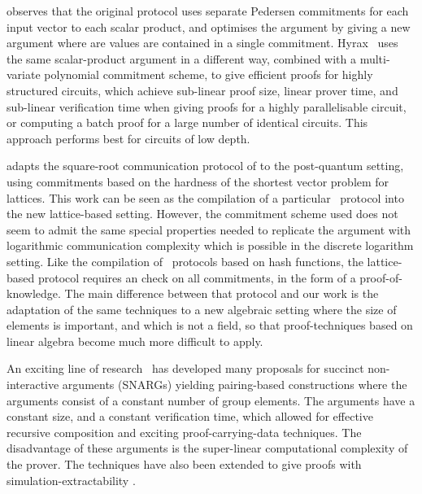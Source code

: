\cite{BunzBBPWM18} observes that the original protocol uses separate Pedersen commitments for each input vector to each scalar product, and optimises the argument by giving a new argument where are values are contained in a single commitment. Hyrax~\cite{WahbyTSTW18} uses the same scalar-product argument in a different way, combined with a multi-variate polynomial commitment scheme, to give efficient proofs for highly structured circuits, which achieve sub-linear proof size, linear prover time, and sub-linear verification time when giving proofs for a highly parallelisable circuit, or computing a batch proof for a large number of identical circuits. This approach performs best for circuits of low depth.

\cite{BaumBCPGL18} adapts the square-root communication protocol of \cite{BootleCCGP16} to the post-quantum setting, using commitments based on the hardness of the shortest vector problem for lattices. This work can be seen as the compilation of a particular \ILC\ protocol into the new lattice-based setting. However, the commitment scheme used does not seem to admit the same special properties needed to replicate the argument with logarithmic communication complexity which is possible in the discrete logarithm setting. Like the compilation of \ILC\ protocols based on hash functions, the lattice-based protocol requires an check on all commitments, in the form of a proof-of-knowledge. The main difference between that protocol and our work is the adaptation of the same techniques to a new algebraic setting where the size of elements is important, and which is not a field, so that proof-techniques based on linear algebra become much more difficult to apply.

An exciting line of research~\cite{Groth2010b,Lip12,Bitansky2012,Gennaro2013,Bitansky2013,PHGR13, C:BCGTV13,BCTV14} has developed many proposals for succinct non-interactive arguments (SNARGs) yielding pairing-based constructions where the arguments consist of a constant number of group elements. The arguments have a constant size, and a constant verification time, which allowed for effective recursive composition \cite{Bitansky2013} and exciting proof-carrying-data techniques. The disadvantage of these arguments is the super-linear computational complexity of the prover. The techniques have also been extended to give proofs with simulation-extractability \cite{GrothM17,BoweG18}.

